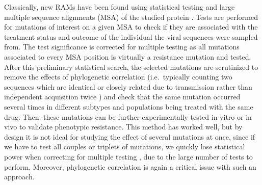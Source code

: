 \documentclass[
  11pt,
  twoside,
  BCOR=10mm,
  listof=totoc]{scrbook}
\begin{document}
Classically, new RAMs have been found using statistical testing and
large multiple sequence alignments (MSA) of the studied protein
\autocite{dudoitMultipleTestingProcedures2007,villabona-arenasIndepthAnalysisHIV12016}.
Tests are performed for mutations of interest on a given MSA to check if
they are associated with the treatment status and outcome of the
individual the viral sequences were sampled from. The test significance
is corrected for multiple testing as all mutations associated to every
MSA position is virtually a resistance mutation and tested. After this
preliminary statistical search, the selected mutations are scrutinized
to remove the effects of phylogenetic correlation (i.e.~typically
counting two sequences which are identical or closely related due to
transmission rather than independent acquisition twice
\autocite{maddisonUnsolvedChallengePhylogenetic2015}) and check that the same
mutation occurred several times in different subtypes and populations
being treated with the same drug. Then, these mutations can be further
experimentally tested in vitro or in vivo to validate phenotypic
resistance. This method has worked well, but by design it is not ideal
for studying the effect of several mutations at once, since if we have
to test all couples or triplets of mutations, we quickly lose
statistical power when correcting for multiple testing
\autocite{shamStatisticalPowerSignificance2014}, due to the large number of
tests to perform. Moreover, phylogenetic correlation is again a critical
issue with such an approach.
\end{document}
